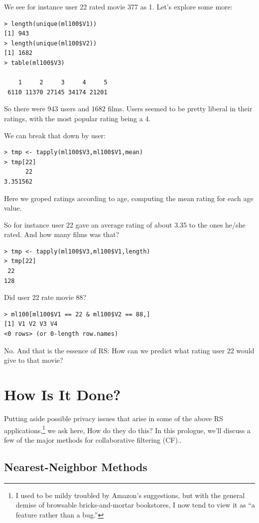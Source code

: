 We see for instance user 22 rated movie 377 as 1.  Let's explore some more:

\begin{lstlisting}
> length(unique(ml100$V1))
[1] 943
> length(unique(ml100$V2))
[1] 1682
> table(ml100$V3)

    1     2     3     4     5 
 6110 11370 27145 34174 21201 
\end{lstlisting}

So there were 943 users and 1682 films.  Users seemed to be pretty
liberal in their ratings, with the most popular rating being a 4.

We can break that down by user:

\begin{lstlisting}
> tmp <- tapply(ml100$V3,ml100$V1,mean)
> tmp[22]
      22 
3.351562 
\end{lstlisting}

Here we groped ratings according to age, computing the mean rating for
each age value.

So for instance user 22 gave an average rating of about 3.35 to the ones
he/she rated.  And how many films was that?

\begin{lstlisting}
> tmp <- tapply(ml100$V3,ml100$V1,length)
> tmp[22]
 22 
128 
\end{lstlisting}

Did user 22 rate movie 88?

\begin{lstlisting}
> ml100[ml100$V1 == 22 & ml100$V2 == 88,]
[1] V1 V2 V3 V4
<0 rows> (or 0-length row.names)
\end{lstlisting}

No.  And that is the essence of RS:  How can we predict what rating user
22 would give to that movie?


\section{How Is It Done?}

Putting aside possible privacy issues that arise in some of the above RS
applications,\footnote{I used to be mildy
troubled by Amazon's suggestions, but with the general demise of
browsable bricks-and-mortar bookstores, I now tend to view it as ``a
feature rather than a bug.''} we ask here, How do they do this?  In this
prologue, we'll discuss a few of the major methods for collaborative
filtering (CF)..

\subsection{Nearest-Neighbor Methods}

